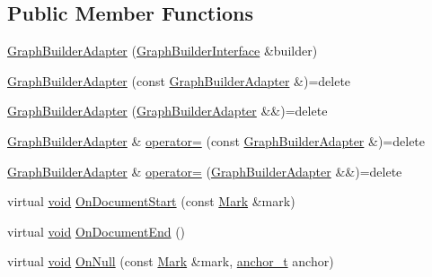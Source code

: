 \subsection*{Public Member Functions}
\begin{DoxyCompactItemize}
\item 
\mbox{\hyperlink{class_y_a_m_l_1_1_graph_builder_adapter_ab6065da602dd256c9664dbcf9bbcd4bb}{Graph\+Builder\+Adapter}} (\mbox{\hyperlink{class_y_a_m_l_1_1_graph_builder_interface}{Graph\+Builder\+Interface}} \&builder)
\item 
\mbox{\hyperlink{class_y_a_m_l_1_1_graph_builder_adapter_acb3a292b07fe50875a2ce8199e4ca80f}{Graph\+Builder\+Adapter}} (const \mbox{\hyperlink{class_y_a_m_l_1_1_graph_builder_adapter}{Graph\+Builder\+Adapter}} \&)=delete
\item 
\mbox{\hyperlink{class_y_a_m_l_1_1_graph_builder_adapter_a6440bb972418238961eff8c70c67a748}{Graph\+Builder\+Adapter}} (\mbox{\hyperlink{class_y_a_m_l_1_1_graph_builder_adapter}{Graph\+Builder\+Adapter}} \&\&)=delete
\item 
\mbox{\hyperlink{class_y_a_m_l_1_1_graph_builder_adapter}{Graph\+Builder\+Adapter}} \& \mbox{\hyperlink{class_y_a_m_l_1_1_graph_builder_adapter_ac9d68c3570b038036e6fc80e1da5aded}{operator=}} (const \mbox{\hyperlink{class_y_a_m_l_1_1_graph_builder_adapter}{Graph\+Builder\+Adapter}} \&)=delete
\item 
\mbox{\hyperlink{class_y_a_m_l_1_1_graph_builder_adapter}{Graph\+Builder\+Adapter}} \& \mbox{\hyperlink{class_y_a_m_l_1_1_graph_builder_adapter_ae89b1f7cd4c08bf981ba61f85c9885a0}{operator=}} (\mbox{\hyperlink{class_y_a_m_l_1_1_graph_builder_adapter}{Graph\+Builder\+Adapter}} \&\&)=delete
\item 
virtual \mbox{\hyperlink{glad_8h_a950fc91edb4504f62f1c577bf4727c29}{void}} \mbox{\hyperlink{class_y_a_m_l_1_1_graph_builder_adapter_aae52d2e2c6d73fd4df9b7979cdee8de6}{On\+Document\+Start}} (const \mbox{\hyperlink{struct_y_a_m_l_1_1_mark}{Mark}} \&mark)
\item 
virtual \mbox{\hyperlink{glad_8h_a950fc91edb4504f62f1c577bf4727c29}{void}} \mbox{\hyperlink{class_y_a_m_l_1_1_graph_builder_adapter_a9f0b8ba153afc80ba449dea7a17d2f1f}{On\+Document\+End}} ()
\item 
virtual \mbox{\hyperlink{glad_8h_a950fc91edb4504f62f1c577bf4727c29}{void}} \mbox{\hyperlink{class_y_a_m_l_1_1_graph_builder_adapter_adeacb6c59aabf0622af8ed3808de9ab9}{On\+Null}} (const \mbox{\hyperlink{struct_y_a_m_l_1_1_mark}{Mark}} \&mark, \mbox{\hyperlink{namespace_y_a_m_l_abeff1798814ae3402fc5665fdcad1de6}{anchor\+\_\+t}} anchor)

\end{DoxyCompactItemize}

